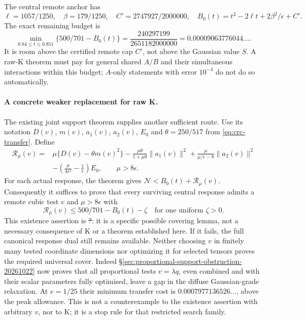 The central remote anchor has
\[
 \ell=1057/1250,\quad\beta=179/1250,\quad
 C'=2747927/2000000,\quad
 B_0(t)=t^2-2\ell t+2\beta^2/\epsilon+C'.
\]
The exact remaining budget is
\[
 \min_{0.84\le t\le0.851}\{500/701-B_0(t)\}
 =\frac{240297199}{2651182000000}
 =0.00009063776044\ldots .
\]
It is room above the certified remote cap $C'$, not above the Gaussian
value $S$. A raw-K theorem must pay for general shared $A/B$ and their
simultaneous interactions within this budget; $A$-only statements
with error $10^{-4}$ do not do so automatically.

\paragraph{A concrete weaker replacement for raw K.}
The existing joint support theorem supplies another sufficient route.
Use its notation $D(v)$, $m(v)$, $a_1(v)$, $a_2(v)$, $E_0$ and
$\theta=250/517$ from \eqref{eq:crc-transfer}. Define
\[
\begin{split}
 \mathcal R_\mu(v)={}&\mu\{D(v)-\theta m(v)^2\}
 -\frac{\mu\theta}{1+\mu\theta}\|a_1(v)\|^2
 +\frac{\mu}{\mu/\epsilon-8}\|a_2(v)\|^2\\
 &-\left(\frac{\mu}{4\epsilon^2}-\frac1\epsilon\right)E_0,
 \qquad\mu>8\epsilon.
\end{split}
\]
For each actual response, the theorem gives
$\mathcal N<B_0(t)+\mathcal R_\mu(v)$.
Consequently it suffices to prove that every surviving central response
admits a remote cubic test $v$ and $\mu>8\epsilon$ with
\[
 \mathcal R_\mu(v)\le500/701-B_0(t)-\zeta
 \quad\text{for one uniform }\zeta>0.
\]
This existence assertion is \st{?}: it is a specific possible covering
lemma, not a necessary consequence of K or a theorem established here.
If it fails, the full canonical response dual still remains available.
Neither choosing $v$ in finitely many tested coordinate dimensions nor
optimizing it for selected tensors proves the required universal cover.
Indeed \S\ref{sec:proportional-support-obstruction-20261022} now proves
that all proportional tests $v=\lambda q$, even combined and with their
scalar parameters fully optimised, leave a gap in the diffuse
Gaussian-grade relaxation. At $e=1/25$ their minimum transfer cost is
$0.0007977136526\ldots$, above the peak allowance. This is not a
counterexample to the existence assertion with arbitrary $v$, nor to K;
it is a stop rule for that restricted search family.

